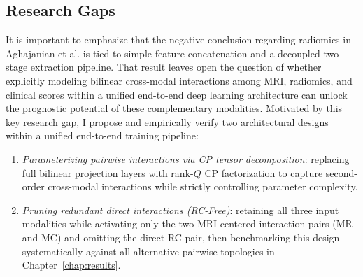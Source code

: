 \subsection{Research Gaps}
\label{sec:research-gaps}
It is important to emphasize that the negative conclusion regarding radiomics in Aghajanian et al. is tied to simple feature concatenation and a decoupled two-stage extraction pipeline. That result leaves open the question of whether explicitly modeling bilinear cross-modal interactions among MRI, radiomics, and clinical scores within a unified end-to-end deep learning architecture can unlock the prognostic potential of these complementary modalities. Motivated by this key research gap, I propose and empirically verify two architectural designs within a unified end-to-end training pipeline:
\begin{enumerate}[itemsep=0.1em,topsep=0.2em]
\item \emph{Parameterizing pairwise interactions via CP tensor decomposition}: replacing full bilinear projection layers with rank-$Q$ CP factorization to capture second-order cross-modal interactions while strictly controlling parameter complexity.
\item \emph{Pruning redundant direct interactions (RC-Free)}: retaining all three input modalities while activating only the two MRI-centered interaction pairs (MR and MC) and omitting the direct RC pair, then benchmarking this design systematically against all alternative pairwise topologies in Chapter~\ref{chap:results}.
\end{enumerate}

